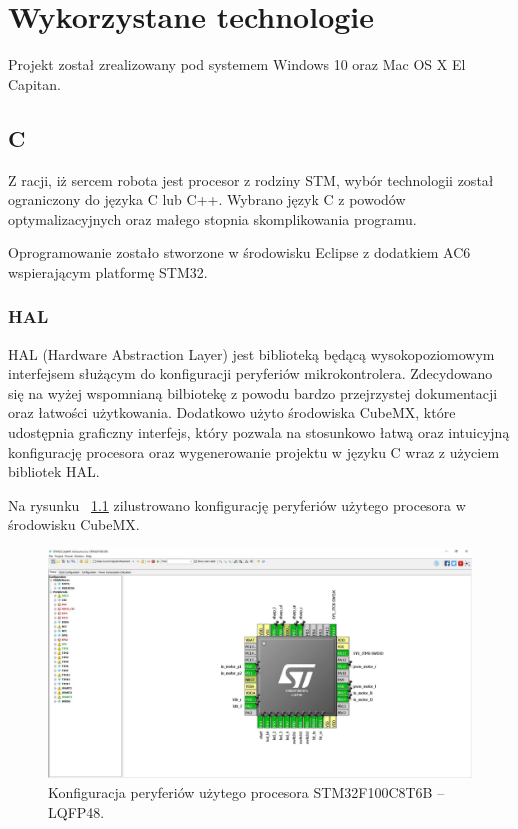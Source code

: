 \chapter{Wykorzystane technologie}

Projekt został zrealizowany pod systemem Windows 10 oraz Mac OS X El Capitan. 

\section{C}
Z racji, iż sercem robota jest procesor z rodziny STM, wybór technologii został ograniczony do języka C lub C++. Wybrano język C z powodów optymalizacyjnych oraz małego stopnia skomplikowania programu. 


Oprogramowanie zostało stworzone w środowisku Eclipse z dodatkiem AC6 wspierającym platformę STM32.

\subsection{HAL}
HAL (Hardware Abstraction Layer) jest biblioteką będącą wysokopoziomowym interfejsem służącym do konfiguracji peryferiów mikrokontrolera. Zdecydowano się na wyżej wspomnianą bilbiotekę z powodu bardzo przejrzystej dokumentacji oraz łatwości użytkowania. Dodatkowo użyto środowiska CubeMX, które udostępnia graficzny interfejs, który pozwala na stosunkowo łatwą oraz intuicyjną konfigurację procesora oraz wygenerowanie projektu w języku C wraz z użyciem bibliotek HAL.


Na rysunku ~\ref{fig:cubemx} zilustrowano konfigurację peryferiów użytego procesora w środowisku CubeMX.   

\begin{figure}[H]
	\centering
		\includegraphics[width=0.75\linewidth]{pic02/cubemx.jpg}
	\caption{Konfiguracja peryferiów użytego procesora STM32F100C8T6B – LQFP48.}
	\label{fig:cubemx}	
\end{figure}

